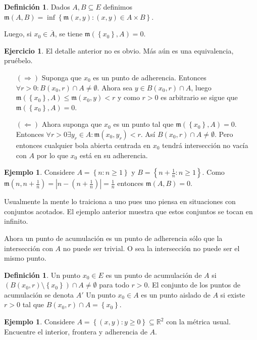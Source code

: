 \documentclass[12pt]{article}
\theoremstyle{plain}
\theoremstyle{definition}
\newtheorem{Def}[Th]{Definición}       %
\newtheorem{Ex}[Th]{Ejemplo}               %
\newtheorem{Ej}[Th]{Ejercicio}
\theoremstyle{remark}
\numberwithin{equation}{section}
\newcommand{\bR}{\mathbb{R}}        %
\newcommand{\mm}{\mathfrak{m}}      %
\renewcommand{\geq}{\geqslant}      %
\renewcommand{\leq}{\leqslant}      %
\renewcommand{\:}{\colon}           %
\newcommand{\conj}[1]{\left\lbrace#1\right\rbrace}
\begin{document}
\begin{multicols}{2}
\begin{Def}
  Dados $A,B\subseteq E$ definimos $\mm(A,B) = \inf\conj{\mm(x,y)\colon (x,y)\in A\times B}$.
\end{Def}

Luego, si $x_0\in\overline{A}$, se tiene $\mm(\conj{x_0},A)=0$.

\begin{Ej}\label{ej:clausuraMetricaIffDistanciaCero}
  El detalle anterior no es obvio. Más aún es una equivalencia, pruébelo.
\end{Ej}

\begin{ptcb}
\begin{enumerate}
  \item[$(\Rightarrow)$] Suponga que $x_0$ es un punto de adherencia. Entonces $\forall r>0\colon B(x_0,r)\cap A\neq \emptyset$. Ahora sea $y\in B(x_0,r)\cap A$, luego $\mm(\conj{x_0},A)\leq\mm(x_0,y)< r$ y como $r>0$ es arbitrario se sigue que  $\mm(\conj{x_0},A)=0$.
  \item[$(\Leftarrow)$]Ahora suponga que $x_0$ es un punto tal que $\mm(\conj{x_0},A)=0$. Entonces $\forall r>0\exists y_r\in A\colon \mm(x_0,y_r)<r$. Así $B(x_0,r)\cap A\neq \emptyset$. Pero entonces cualquier bola abierta centrada en $x_0$ tendrá intersección no vacía con $A$ por lo que $x_0$ está en su adherencia.
\end{enumerate}
\end{ptcb}
\begin{Ex}
  Considere $A=\conj{n\colon n\geq 1}$ y $B=\conj{n+\frac{1}{n}\colon n\geq 1}$. Como $\mm(n,n+\frac{1}{n})=|n-(n+\frac{1}{n})|=\frac{1}{n}$ entonces $\mm(A,B)=0$.
\end{Ex}
Usualmente la mente lo traiciona a uno pues uno piensa en situaciones con conjuntos acotados. El ejemplo anterior muestra que estos conjuntos se tocan en infinito.\par
Ahora un punto de acumulación es un punto de adherencia sólo que la intersección con $A$ no puede ser trivial. O sea la intersección no puede ser el mismo punto.
\begin{Def}
  Un punto $x_0\in E$ es un punto de acumulación de $A$ si $\left(B(x_0,r)\setminus\conj{x_0}\right)\cap A \neq \emptyset$ para todo $r>0$. El conjunto de los puntos de acumulación se denota $A'$
  Un punto $x_0\in A$ es un punto aislado de $A$ si existe $r>0$ tal que $B(x_0,r)\cap A =\conj{x_0}$.
\end{Def}

\begin{Ex}
  Considere $A=\conj{(x,y)\colon y\geq 0}\subseteq \bR^2$ con la métrica usual. Encuentre el interior, frontera y adherencia de $A$.
   \end{Ex}


\end{multicols}
\end{document}
